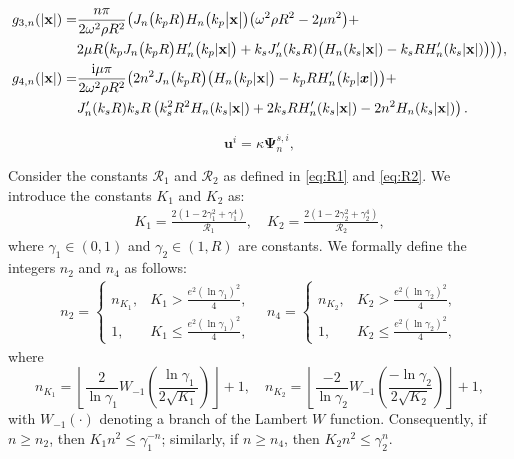 \documentclass[10pt,a4paper]{amsart}
\newcommand{\bu}{\mathbf{u}}
\newcommand{\bx}{\mathbf{x}}
\begin{document}
\begin{lem}
\begin{align}
		g_{3,n}(|\bx|)=& \frac{n\pi}{2\omega^{2}\rho R^{2}}\big(J_{n}\big(k_{p}R\big)H_{n}\big(k_{p}\big|\mathbf{x}\big|\big)\big(\omega^{2}\rho R^{2}-2\mu n^{2}\big)+ \notag\\
		&2\mu R\big(k_pJ_n\big(k_pR\big)H_n'\big(k_p|\bx|\big)+k_sJ_n'(k_sR)\big(H_n(k_s|\bx|)-k_sRH_n'(k_s|\bx|)\big)\big)\big), \notag\\
		g_{4,n}(|\bx|)=& \frac{\mathrm{i}\mu\pi}{2\omega^{2}\rho R^{2}}\big(2n^{2}J_{n}\big(k_{p}R\big)\big(H_{n}\big(k_{p}|\bx|\big)-k_{p}RH_{n}^{\prime}\big(k_{p}|\bm{x}|\big)\big)+ \notag\\
		&J_n^{\prime}(k_sR)k_sR\left(k_s^2R^2H_n(k_s|\bx|)+2k_sRH_n^{\prime}(k_s|\bx|)-2n^2H_n(k_s|\bx|)\right).\notag
	\end{align}
\end{lem}

\begin{equation}\label{eq:ui}
	{\bu}^{i}=\kappa \bm{\Psi}_{n}^{s,i},
\end{equation}

\begin{lem}\label{lem:thmxy}
	Consider the constants $\mathcal{R}_1$ and $\mathcal{R}_2$ as defined in \eqref{eq:R1} and \eqref{eq:R2}. We introduce the constants \(K_1\) and \(K_2\) as:
	\begin{align}\label{eq:lemk1k2}
		K_{1} = \frac{2(1-2\gamma_{1}^2+\gamma_{1}^4)}{\mathcal{R}_{1}}, \quad K_{2} =\frac{2\left(1-2\gamma_{2}^2+\gamma_{2}^4\right)}{\mathcal{R}_{2}},
	\end{align}
	where \(\gamma_1 \in (0, 1)\) and \(\gamma_2 \in (1, R)\) are constants. We formally define the integers \(n_2\) and \(n_4\) as follows:
	\begin{align}\label{eq:n24}
		n_{2}=\left\{
		\begin{array}
			{ll}n_{K_{1}}, &K_{1} > \frac{e^2(\ln\gamma_{1})^2}{4}, \\
			1, & K_{1} \leq \frac{e^2(\ln\gamma_{1})^2}{4},
		\end{array}\right.\quad
		n_{4}=\left\{
		\begin{array}
			{ll}n_{K_{2}}, &K_{2} > \frac{e^2(\ln\gamma_{2})^2}{4}, \\
			1, & K_{2} \leq \frac{e^2(\ln\gamma_{2})^2}{4},
		\end{array}\right.
	\end{align}
	where
	\begin{displaymath}
		n_{K_{1}}= \left\lfloor\frac{2}{\ln\gamma_{1}}W_{-1}\left(\frac{\ln\gamma_{1}}{2\sqrt{K_{1}}}\right)\right\rfloor+1,\quad n_{K_{2}} = \left\lfloor\frac{-2}{\ln\gamma_{2}}W_{-1}\left(\frac{-\ln\gamma_{2}}{2\sqrt{K_{2}}}\right)\right\rfloor+1,
	\end{displaymath}
	with \(W_{-1}\left(\cdot\right)\) denoting a branch of the Lambert \(W\) function.
	Consequently, if \( n \geq n_2 \), then \( K_1 n^2 \leq \gamma_1^{-n} \); similarly, if \( n \geq n_4 \), then \( K_2 n^2 \leq \gamma_2^{n} \).
\end{lem}
\end{document}
